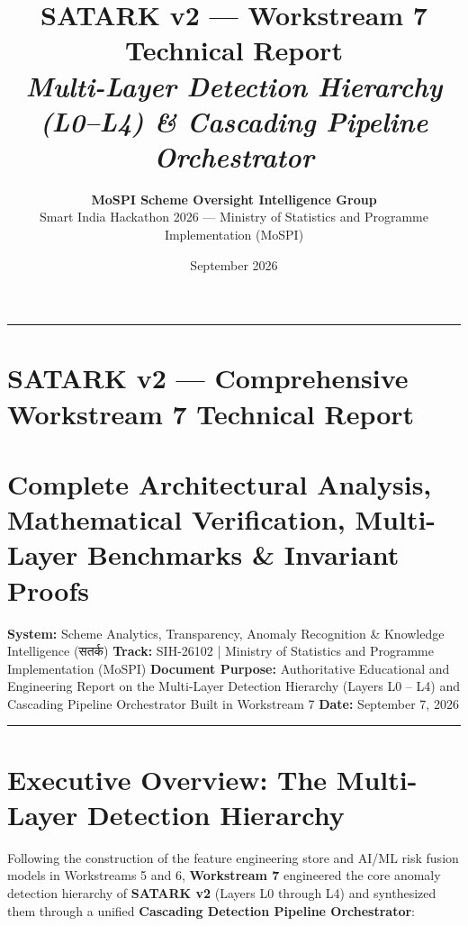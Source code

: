 \documentclass[11pt,a4paper]{article}
\title{\Large\textbf{SATARK v2 --- Workstream 7 Technical Report}\\[0.4em]\large\textit{Multi-Layer Detection Hierarchy (L0--L4) \& Cascading Pipeline Orchestrator}}
\author{\textbf{MoSPI Scheme Oversight Intelligence Group}\\Smart India Hackathon 2026 --- Ministry of Statistics and Programme Implementation (MoSPI)}
\date{September 2026}
\begin{document}
\maketitle
\tableofcontents
\vspace{1.5em}
\hrule
\vspace{1.5em}

\clearpage
\section*{SATARK v2 --- Comprehensive Workstream 7 Technical Report}
\section{Complete Architectural Analysis, Mathematical Verification, Multi-Layer Benchmarks \& Invariant Proofs}
\textbf{System:} Scheme Analytics, Transparency, Anomaly Recognition \& Knowledge Intelligence (सतर्क)
\textbf{Track:} SIH-26102 | Ministry of Statistics and Programme Implementation (MoSPI)
\textbf{Document Purpose:} Authoritative Educational and Engineering Report on the Multi-Layer Detection Hierarchy (Layers L0 -- L4) and Cascading Pipeline Orchestrator Built in Workstream 7
\textbf{Date:} September 7, 2026

\vspace{1em}\hrule\vspace{1em}

\section{Executive Overview: The Multi-Layer Detection Hierarchy}

Following the construction of the feature engineering store and AI/ML risk fusion models in Workstreams 5 and 6, \textbf{Workstream 7} engineered the core anomaly detection hierarchy of \textbf{SATARK v2} (Layers L0 through L4) and synthesized them through a unified \textbf{Cascading Detection Pipeline Orchestrator}:
\end{document}

